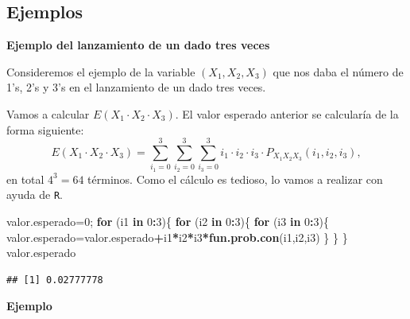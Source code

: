 \documentclass[]{book}
\newenvironment{Shaded}{\begin{snugshade}}{\end{snugshade}}
\newcommand{\ControlFlowTok}[1]{\textcolor[rgb]{0.13,0.29,0.53}{\textbf{#1}}}
\newcommand{\DecValTok}[1]{\textcolor[rgb]{0.00,0.00,0.81}{#1}}
\newcommand{\KeywordTok}[1]{\textcolor[rgb]{0.13,0.29,0.53}{\textbf{#1}}}
\newcommand{\NormalTok}[1]{#1}
\newcommand{\OperatorTok}[1]{\textcolor[rgb]{0.81,0.36,0.00}{\textbf{#1}}}
\begin{document}
\hypertarget{ejemplos-20}{%
\subsection{Ejemplos}\label{ejemplos-20}}

\textbf{Ejemplo del lanzamiento de un dado tres veces}

Consideremos el ejemplo de la variable \((X_1,X_2,X_3)\) que nos daba el número de 1's, 2's y 3's en el lanzamiento de un dado tres veces.

Vamos a calcular \(E\left(X_1\cdot X_2\cdot X_3\right)\).
El valor esperado anterior se calcularía de la forma siguiente:
\[
E\left(X_1\cdot X_2\cdot X_3\right)=\sum_{i_1=0}^3\sum_{i_2=0}^3
\sum_{i_3=0}^3 i_1\cdot i_2\cdot i_3\cdot P_{X_1X_2X_3}(i_1,i_2,i_3),
\]
en total \(4^3=64\) términos. Como el cálculo es tedioso, lo vamos a realizar con ayuda de \texttt{R}.

\begin{Shaded}
\begin{Highlighting}[]
\NormalTok{valor.esperado=}\DecValTok{0}\NormalTok{;}
\ControlFlowTok{for}\NormalTok{ (i1 }\ControlFlowTok{in} \DecValTok{0}\OperatorTok{:}\DecValTok{3}\NormalTok{)\{}
  \ControlFlowTok{for}\NormalTok{ (i2 }\ControlFlowTok{in} \DecValTok{0}\OperatorTok{:}\DecValTok{3}\NormalTok{)\{}
    \ControlFlowTok{for}\NormalTok{ (i3 }\ControlFlowTok{in} \DecValTok{0}\OperatorTok{:}\DecValTok{3}\NormalTok{)\{}
\NormalTok{      valor.esperado=valor.esperado}\OperatorTok{+}\NormalTok{i1}\OperatorTok{*}\NormalTok{i2}\OperatorTok{*}\NormalTok{i3}\OperatorTok{*}\KeywordTok{fun.prob.con}\NormalTok{(i1,i2,i3)}
\NormalTok{    \}}
\NormalTok{  \}}
\NormalTok{\}}
\NormalTok{valor.esperado}
\end{Highlighting}
\end{Shaded}

\begin{verbatim}
## [1] 0.02777778
\end{verbatim}

\textbf{Ejemplo}
\end{document}
